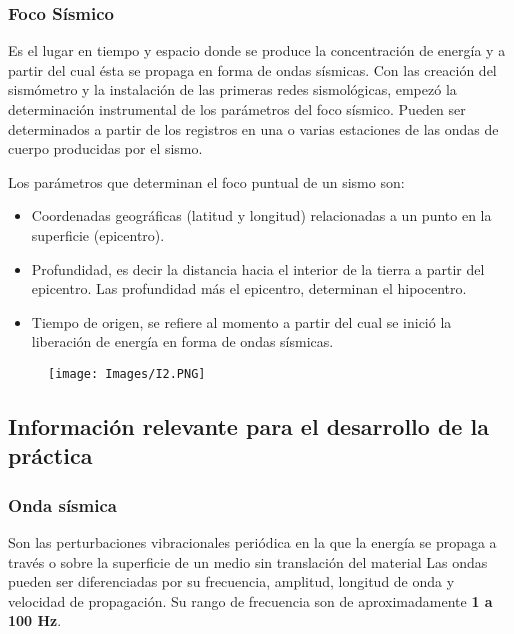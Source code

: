 \documentclass[12pt]{article}
\begin{document}
    	    \subsubsection{Foco Sísmico}
    	    Es el lugar en tiempo y espacio donde se produce la concentración de energía y a partir del cual ésta se propaga en forma de ondas sísmicas. Con las creación del sismómetro y la instalación de las primeras redes sismológicas, empezó la determinación instrumental de los parámetros del foco sísmico. Pueden ser determinados a partir de los registros en una o varias estaciones de las ondas de cuerpo producidas por el sismo.
    	    
    	    Los parámetros que determinan el foco puntual de un sismo son:
    	    \begin{itemize}
    	        \item Coordenadas geográficas (latitud y longitud) relacionadas a un punto en la superficie (epicentro).
    	        \item Profundidad, es decir la distancia hacia el interior de la tierra a partir del epicentro. Las profundidad más el epicentro, determinan el hipocentro.
    	        \item Tiempo de origen, se refiere al momento a partir del cual se inició la liberación de energía en forma de ondas sísmicas.
    	    \end{itemize}
    	    \begin{figure}[H]
    	       \centering
    	       \texttt{[image: Images/I2.PNG]}
    	    \end{figure}
    	   
	    \subsection{Información relevante para el desarrollo de la práctica}
            \subsubsection{Onda sísmica}
        	   Son las perturbaciones vibracionales periódica en la que la energía se propaga a través o sobre la superficie de un medio sin translación del material Las ondas pueden ser diferenciadas por su frecuencia, amplitud, longitud de onda y velocidad de propagación. Su rango de frecuencia son de aproximadamente \textbf{1 a 100 Hz}.
        	   
\end{document}
